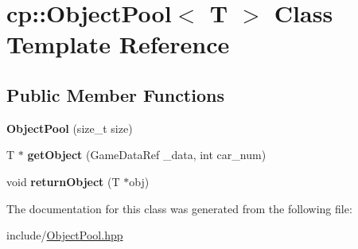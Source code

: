\hypertarget{classcp_1_1_object_pool}{}\section{cp\+:\+:Object\+Pool$<$ T $>$ Class Template Reference}
\label{classcp_1_1_object_pool}
\subsection*{Public Member Functions}
\begin{DoxyCompactItemize}
\item 
\mbox{\label{classcp_1_1_object_pool_a1877a6544a870ef9b18b38400618995a}} 
{\bfseries Object\+Pool} (size\+\_\+t size)
\item 
\mbox{\label{classcp_1_1_object_pool_a5a129a05d30a6d8303e21b47e7eceead}} 
T $\ast$ {\bfseries get\+Object} (Game\+Data\+Ref \+\_\+data, int car\+\_\+num)
\item 
\mbox{\label{classcp_1_1_object_pool_a343f35dbeb2474d8b075d04ce9ebbf79}} 
void {\bfseries return\+Object} (T $\ast$obj)
\end{DoxyCompactItemize}


The documentation for this class was generated from the following file\+:\begin{DoxyCompactItemize}
\item 
include/\hyperlink{_object_pool_8hpp}{Object\+Pool.\+hpp}\end{DoxyCompactItemize}
